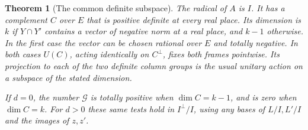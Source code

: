 \documentclass[a4paper,11pt]{article}
\newtheorem{theorem}[proposition]{Theorem}
\theoremstyle{definition}
\theoremstyle{remark}
\numberwithin{equation}{section}
\begin{document}
\begin{theorem}[The common definite subspace]\label{thm:cross132}
The radical of \(A\) is \(I\). It has a complement \(C\) over \(E\)
that is positive definite at every real place. Its dimension is
\(k\) if \(Y\cap Y'\) contains a vector of negative norm at a
real place, and \(k-1\) otherwise. In the first case the vector
can be chosen rational over \(E\) and totally negative.
In both cases \(U(C)\), acting identically on \(C^\perp\), fixes
both frames pointwise. Its projection to each of the two definite
column groups is the usual unitary action on a subspace of the
stated dimension.

If \(d=0\), the number \(\mathcal G\) is totally positive when
\(\dim C=k-1\), and is zero when \(\dim C=k\).
For \(d>0\) these same tests hold in \(I^\perp/I\), using any
bases of \(L/I,L'/I\) and the images of \(z,z'\).
\end{theorem}
\end{document}
